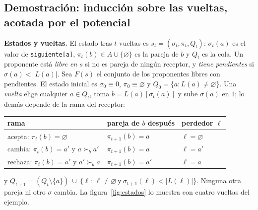 \documentclass[11pt]{article}
\begin{document}
\subsection*{Demostración: inducción sobre las vueltas, acotada por el potencial}

\textbf{Estados y vueltas.} El estado tras $t$ vueltas es $s_t=(\sigma_t,\pi_t,Q_t)$: $\sigma_t(a)$ es el valor
de \texttt{siguiente[a]}, $\pi_t(b)\in A\cup\{\varnothing\}$ es la pareja de $b$ y $Q_t$ es la cola. Un proponente
está \emph{libre en $s$} si no es pareja de ningún receptor, y \emph{tiene pendientes} si $\sigma(a)<|L(a)|$.
Sea $F(s)$ el conjunto de los proponentes libres con pendientes. El estado inicial es $\sigma_0\equiv0$,
$\pi_0\equiv\varnothing$ y $Q_0=\{a:L(a)\ne\varnothing\}$. Una \emph{vuelta} elige cualquier $a\in Q_t$, toma
$b=L(a)[\sigma_t(a)]$ y sube $\sigma(a)$ en $1$; lo demás depende de la rama del receptor:
\begin{center}\small
\begin{tabular}{@{}lll@{}}
\toprule
\textbf{rama} & \textbf{pareja de $b$ después} & \textbf{perdedor $\ell$}\\
\midrule
acepta: $\pi_t(b)=\varnothing$ & $\pi_{t+1}(b)=a$ & $\ell=\varnothing$\\
cambia: $\pi_t(b)=a'$ y $a\succ_ba'$ & $\pi_{t+1}(b)=a$ & $\ell=a'$\\
rechaza: $\pi_t(b)=a'$ y $a'\succ_ba$ & $\pi_{t+1}(b)=a'$ & $\ell=a$\\
\bottomrule
\end{tabular}
\end{center}
y $Q_{t+1}=(Q_t\setminus\{a\})\ \cup\ \{\ell:\ \ell\ne\varnothing\ \text{y}\ \sigma_{t+1}(\ell)<|L(\ell)|\}$. Ninguna
otra pareja ni otro $\sigma$ cambia. La figura~\ref{fig:estados} lo muestra con cuatro vueltas del ejemplo.
\end{document}
